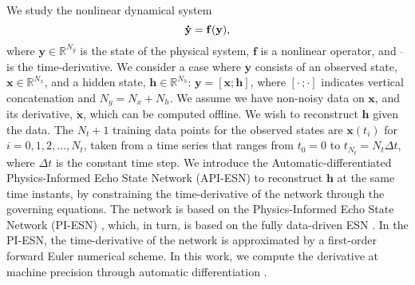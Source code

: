 \documentclass[runningheads]{llncs}
\begin{document}
We study the nonlinear dynamical system 
\begin{equation}
  \label{dyn_sys}
   \bf{\dot{y}}=\mathbf{f}(\mathbf{y}),  
\end{equation}
where $\textbf{y}\in\mathbb{R}^{N_{y}}$ is the state of the physical system, 
$\textbf{f}$ is a nonlinear operator,
and $\dot{\;\;}$ is the time-derivative. 
We consider a case where $\textbf{y}$ consists of an observed state, $\textbf{x}\in\mathbb{R}^{N_{x}}$, and a hidden state, $\textbf{h}\in\mathbb{R}^{N_{h}}$: $\textbf{y}=[\textbf{x};\textbf{h}]$, where $[\cdot\,;\cdot]$ indicates vertical concatenation and $N_y=N_x+N_h$. We assume we have non-noisy data on $\mathbf{x}$, and its derivative, $\mathbf{\dot{x}}$, which can be computed offline. We wish to reconstruct $\textbf{h}$ given the data. The $N_t+1$ training data points for the observed states are $\textbf{x}(t_i)$ for $i=0,1,2,\ldots,N_t$, taken from a time series that ranges from $t_0=0$ to $t_{N_t}=N_t\Delta t$, where $\Delta t$ is the constant time step. We introduce the Automatic-differentiated Physics-Informed Echo State Network (API-ESN) to reconstruct $\textbf{h}$ at the same time instants, by constraining the time-derivative of the network through the governing equations. The network is based on the Physics-Informed Echo State Network (PI-ESN) \cite{doan2019physics,doan2020learning}, which, in turn, is based on the fully data-driven ESN \cite{jaeger2004harnessing,lukovsevivcius2012practical}. In the PI-ESN, the time-derivative of the network is approximated by a first-order forward Euler numerical scheme. In this work, we compute the derivative at machine precision through automatic differentiation \cite{tensorflow2015-whitepaper,baydin2017automatic}. 
\end{document}
